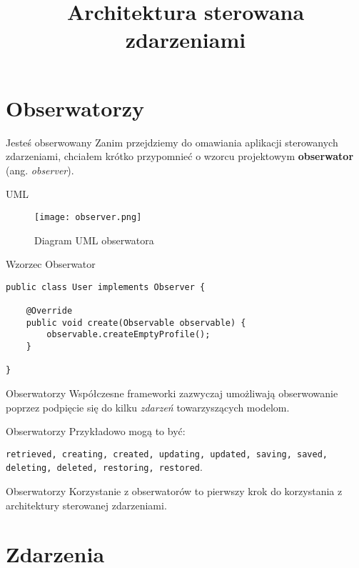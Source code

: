 

\title{Architektura sterowana zdarzeniami}



\section{Obserwatorzy}

\begin{frame}{Jesteś obserwowany}
	Zanim przejdziemy do omawiania aplikacji sterowanych zdarzeniami, chciałem krótko przypomnieć o wzorcu projektowym \textbf{obserwator} (ang. \emph{observer}).
\end{frame}

\begin{frame}{UML}
	\begin{figure}[t]
		\centering
		\texttt{[image: observer.png]}
		\caption{Diagram UML obserwatora}
	\end{figure}
\end{frame}

\begin{frame}[fragile]{Wzorzec Obserwator}
\begin{lstlisting}
public class User implements Observer {
 
    @Override
    public void create(Observable observable) {
        observable.createEmptyProfile();
    }
    
}
\end{lstlisting}
\end{frame}

\begin{frame}{Obserwatorzy}
	Współczesne frameworki zazwyczaj umożliwają obserwowanie poprzez podpięcie się do kilku \emph{zdarzeń} towarzyszących modelom.
\end{frame}

\begin{frame}{Obserwatorzy}
	Przykładowo mogą to być:

	\texttt{retrieved, creating, created, updating, updated, saving, saved, deleting, deleted, restoring, restored}.
\end{frame}

\begin{frame}{Obserwatorzy}
	Korzystanie z obserwatorów to pierwszy krok do korzystania z architektury sterowanej zdarzeniami.
\end{frame}

\section{Zdarzenia}

